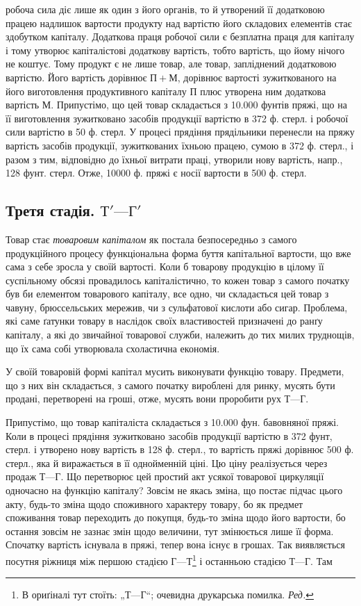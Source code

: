 \parcont{}  %
робоча сила діє лише як один з його органів, то й утворений її додатковою
працею надлишок вартости продукту над вартістю його складових
елементів стає здобутком капіталу. Додаткова праця робочої сили є
безплатна праця для капіталу і тому утворює капіталістові додаткову
вартість, тобто вартість, що йому нічого не коштує. Тому продукт є не
лише товар, але товар, запліднений додатковою вартістю. Його вартість
дорівнює $П + М$, дорівнює вартості зужиткованого на його виготовлення
продуктивного капіталу $П$ плюс утворена ним додаткова вартість $М$.
Припустімо, що цей товар складається з 10.000 фунтів пряжі, що на її
виготовлення зужитковано засобів продукції вартістю в 372 ф. стерл. і
робочої сили вартістю в 50 ф. стерл. У процесі прядіння прядільники
перенесли на пряжу вартість засобів продукції, зужиткованих їхньою
працею, сумою в 372 ф. стерл., і разом з тим, відповідно до їхньої
витрати праці, утворили нову вартість, напр., 128 фунт. стерл. Отже,
10000 ф. пряжі є носії вартости в 500 ф. стерл.

\subsection{Третя стадія. $Т' — Г'$}

Товар стає \emph{товаровим капіталом} як постала безпосередньо з самого
продукційного процесу функціональна форма буття капітальної вартости,
що вже сама з себе зросла у своїй вартості. Коли б товарову продукцію
в цілому її суспільному обсязі провадилось капіталістично, то кожен
товар з самого початку був би елементом товарового капіталу, все одно,
чи складається цей товар з чавуну, брюссельських мережив, чи з сульфатової
кислоти або сигар. Проблема, які саме ґатунки товару в наслідок своїх
властивостей призначені до ранґу капіталу, а які до звичайної товарової
служби, належить до тих милих труднощів, що їх сама собі утворювала
схоластична економія.

У своїй товаровій формі капітал мусить виконувати функцію товару.
Предмети, що з них він складається, з самого початку вироблені для
ринку, мусять бути продані, перетворені на гроші, отже, мусять вони
проробити рух $Т — Г$.

Припустімо, що товар капіталіста складається з 10.000 фун. бавовняної
пряжі. Коли в процесі прядіння зужитковано засобів продукції вартістю
в 372 фунт, стерл. і утворено нову вартість в 128 ф. стерл., то вартість
пряжі дорівнює 500 ф. стерл., яка й виражається в її однойменній ціні.
Цю ціну реалізується через продаж $Т — Г$. Що перетворює цей простий
акт усякої товарової циркуляції одночасно на функцію капіталу? Зовсім
не якась зміна, що постає підчас цього акту, будь-то зміна щодо споживного
характеру товару, бо як предмет споживання товар переходить до покупця,
будь-то зміна щодо його вартости, бо остання зовсім не зазнає змін
щодо величини, тут змінюється лише її форма. Спочатку вартість існувала
в пряжі, тепер вона існує в грошах. Так виявляється посутня
ріжниця між першою стадією $Г — Т$\footnote*{
В ориґіналі тут стоїть: „$Т — Г$“; очевидна друкарська помилка. \emph{Ред.}
} і останньою стадією $Т — Г$. Там
\parbreak{}  %
